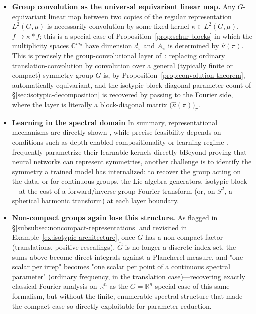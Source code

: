 \documentclass[mathematics,review,submit,moreauthors]{Definitions/mdpi}
\begin{document}
\begin{itemize}
    \item \textbf{Group convolution as the universal equivariant linear
    map.} Any $G$-equivariant linear map between two copies of the regular
    representation $L^2(G,\mu)$ is necessarily convolution by some fixed
    kernel $\kappa \in L^2(G,\mu)$, $f \mapsto \kappa * f$; this is a special
    case of Proposition~\ref{prop:schur-blocks} in which the multiplicity
    spaces $\mathbb{C}^{m_\pi}$ have dimension $d_\pi$ and $A_\pi$ is
    determined by $\widehat{\kappa}(\pi)$. This is precisely the
    group-convolutional layer of~\cite{cohen2014}: replacing ordinary
    translation-convolution by convolution over a general (typically finite
    or compact) symmetry group $G$ is, by
    Proposition~\ref{prop:convolution-theorem}, automatically equivariant,
    and the isotypic block-diagonal parameter count of
    \S\ref{sec:isotypic-decomposition} is recovered by passing to the
    Fourier side, where the layer is literally a block-diagonal matrix
    $\bigl(\widehat{\kappa}(\pi)\bigr)_{\pi}$.
    \item \textbf{Learning in the spectral domain} In summary, representational mechanisms are directly shown \citep{olah2020d,barenboim2021sp}, while precise feasibility depends on conditions such as depth-enabled compositionality or learning regime \citep{perin2025,jacot2025}. frequently
    parametrize their learnable kernels directly bBeyond proving that neural networks can represent symmetries, another challenge is to identify the symmetry a trained model has internalized: to recover the group acting on the data, or for continuous groups, the Lie-algebra generators.
    isotypic block---at the cost of a forward/inverse group Fourier
    transform (or, on $S^2$, a spherical harmonic transform) at each layer
    boundary.
    \item \textbf{Non-compact groups again lose this structure.} As
    flagged in \S\ref{subsubsec:noncompact-representations} and revisited in
    Example~\ref{ex:isotypic-architecture}, once $G$ has a non-compact
    factor (translations, positive rescalings), $\widehat{G}$ is no longer
    a discrete index set, the sums above become direct integrals against a
    Plancherel measure, and "one scalar per irrep" becomes "one scalar per
    point of a continuous spectral parameter" (ordinary frequency, in the
    translation case)---recovering exactly classical Fourier analysis on
    $\mathbb{R}^n$ as the $G = \mathbb{R}^n$ special case of this same
    formalism, but without the finite, enumerable spectral structure that
    made the compact case so directly exploitable for parameter reduction.
\end{itemize}
\end{document}
